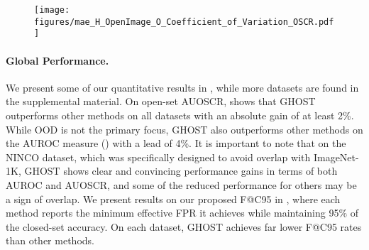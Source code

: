 \begin{table}
\centering
\small
{}
\end{table}


\begin{figure}[tb]
  \centerline{\texttt{[image: figures/mae\_H\_OpenImage\_O\_Coefficient\_of\_Variation\_OSCR.pdf]}}
\end{figure}

\paragraph{Global Performance.}
We present some of our quantitative results in , while more datasets are found in the supplemental material.
On open-set AUOSCR,  shows that GHOST outperforms other methods on all datasets with an absolute gain of at least 2\%.
While OOD is not the primary focus, GHOST also outperforms other methods on the AUROC measure () with a lead of 4\%. 
It is important to note that on the NINCO \cite{bitterwolf2023or} dataset, which was specifically designed to avoid overlap with ImageNet-1K, GHOST shows clear and convincing performance gains in terms of both AUROC and AUOSCR, and some of the reduced performance for others may be a sign of overlap. 
We present results on our proposed F@C95 in , where each method reports the minimum effective FPR it achieves while maintaining 95\% of the closed-set accuracy. 
On each dataset, GHOST achieves far lower F@C95 rates than other methods.

